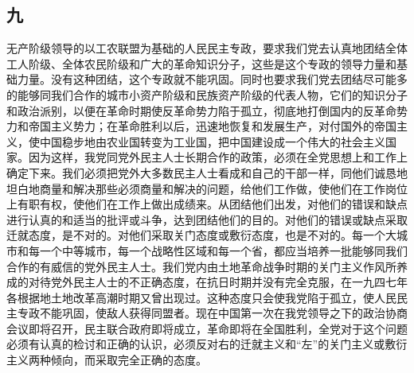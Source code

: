 \documentclass[cn,11pt,chinese]{elegantbook}
\def\myformat#1{\hfil\hfil #1}
\begin{document}
\subsection*{\myformat{九 }}
无产阶级领导的以工农联盟为基础的人民民主专政，要求我们党去认真地团结全体工人阶级、全体农民阶级和广大的革命知识分子，这些是这个专政的领导力量和基础力量。没有这种团结，这个专政就不能巩固。同时也要求我们党去团结尽可能多的能够同我们合作的城市小资产阶级和民族资产阶级的代表人物，它们的知识分子和政治派别，以便在革命时期使反革命势力陷于孤立，彻底地打倒国内的反革命势力和帝国主义势力；在革命胜利以后，迅速地恢复和发展生产，对付国外的帝国主义，使中国稳步地由农业国转变为工业国，把中国建设成一个伟大的社会主义国家。因为这样，我党同党外民主人士长期合作的政策，必须在全党思想上和工作上确定下来。我们必须把党外大多数民主人士看成和自己的干部一样，同他们诚恳地坦白地商量和解决那些必须商量和解决的问题，给他们工作做，使他们在工作岗位上有职有权，使他们在工作上做出成绩来。从团结他们出发，对他们的错误和缺点进行认真的和适当的批评或斗争，达到团结他们的目的。对他们的错误或缺点采取迁就态度，是不对的。对他们采取关门态度或敷衍态度，也是不对的。每一个大城市和每一个中等城市，每一个战略性区域和每一个省，都应当培养一批能够同我们合作的有威信的党外民主人士。我们党内由土地革命战争时期的关门主义作风所养成的对待党外民主人士的不正确态度，在抗日时期并没有完全克服，在一九四七年各根据地土地改革高潮时期又曾出现过。这种态度只会使我党陷于孤立，使人民民主专政不能巩固，使敌人获得同盟者。现在中国第一次在我党领导之下的政治协商会议即将召开，民主联合政府即将成立，革命即将在全国胜利，全党对于这个问题必须有认真的检讨和正确的认识，必须反对右的迁就主义和“左”的关门主义或敷衍主义两种倾向，而采取完全正确的态度。\\
\end{document}
